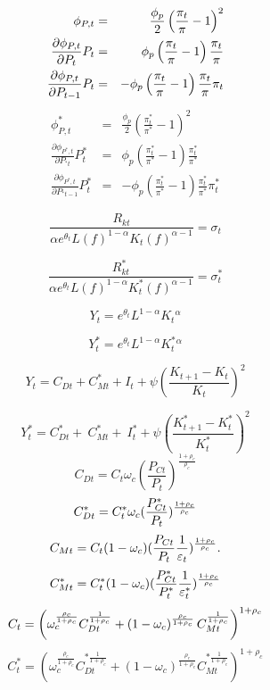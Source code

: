 \documentclass{article}
\begin{document}
\begin{eqnarray*}
\phi _{P,t} &=&\frac{\phi _{p}}{2}\left( \frac{\pi _{t}}{\pi }-1\right) ^{2}
\\
\frac{\partial \phi _{P,t}}{\partial P_{t}}P_{t} &=&\phi _{p}\left( \frac{%
\pi _{t}}{\pi }-1\right) \frac{\pi _{t}}{\pi } \\
\frac{\partial \phi _{P,t}}{\partial P_{t-1}}P_{t} &=&-\phi _{p}\left( \frac{%
\pi _{t}}{\pi }-1\right) \frac{\pi _{t}}{\pi }\pi _{t}
\end{eqnarray*}%
\begin{eqnarray*}
\phi _{P,t}^{\ast } &=&\frac{\phi _{p}}{2}\left( \frac{\pi _{t}^{\ast }}{\pi
^{\ast }}-1\right) ^{2} \\
\frac{\partial \phi _{P^{\ast },t}}{\partial P_{^{\ast }t}}P_{t}^{\ast }
&=&\phi _{p}\left( \frac{\pi _{t}^{\ast }}{\pi ^{\ast }}-1\right) \frac{\pi
_{t}^{\ast }}{\pi ^{\ast }} \\
\frac{\partial \phi _{P^{\ast },t}}{\partial P_{^{\ast }t-1}}P_{t}^{\ast }
&=&-\phi _{p}\left( \frac{\pi _{t}^{\ast }}{\pi ^{\ast }}-1\right) \frac{\pi
_{t}^{\ast }}{\pi ^{\ast }}\pi _{t}^{\ast }
\end{eqnarray*}

\[
\frac{R_{kt}}{\alpha e^{\theta _{t}}L(f)^{1-\alpha }K_{t}(f)^{\alpha -1}}%
=\sigma _{t} 
\]

\[
\frac{R_{kt}^{\ast }}{\alpha e^{\theta _{t}}L(f)^{1-\alpha }K_{t}^{\ast
}(f)^{\alpha -1}}=\sigma _{t}^{\ast } 
\]

\[
Y_{t}=e^{\theta _{t}}L^{1-\alpha }K_{t}{}^{\alpha } 
\]

\[
Y_{t}^{\ast }=e^{\theta _{t}}L^{1-\alpha }K_{t}^{\ast }{}^{\alpha } 
\]

\[
Y_{t}=C_{Dt}+C_{Mt}^{\ast }+I_{t}+\psi \left( \frac{K_{t+1}-K_{t}}{K_{t}}%
\right) ^{2} 
\]

\[
Y_{t}^{\ast }=C_{Dt}^{\ast }+\ C_{Mt}^{\ast }+\ I_{t}^{\ast }+\psi \left( 
\frac{K_{t+1}^{\ast }-K_{t}^{\ast }}{K_{t}^{\ast }}\right) ^{2} 
\]%
\[
C_{Dt}=C_{t}\omega _{c}(\frac{P_{Ct}}{P_{t}})^{\frac{1+\rho _{c}}{\rho _{c}}%
} 
\]%
\[
C_{Dt}^{\ast }=C_{t}^{\ast }\omega _{c}(\frac{P_{Ct}^{\ast }}{P_{t}})^{\frac{%
1+\rho _{c}}{\rho _{c}}} 
\]%
\[
C_{Mt}=C_{t}(1-\omega _{c})(\frac{P_{Ct}}{P_{t}}\frac{1}{\varepsilon _{t}})^{%
\frac{1+\rho _{c}}{\rho _{c}}}. 
\]%
\[
C_{Mt}^{\ast }=C_{t}^{\ast }(1-\omega _{c})(\frac{P_{Ct}^{\ast }}{%
P_{t}^{\ast }}\frac{1}{\varepsilon _{t}^{\ast }})^{\frac{1+\rho _{c}}{\rho
_{c}}} 
\]%
\[
C_{t}=\left( \omega _{c}^{\frac{\rho _{c}}{1+\rho _{c}}}C_{Dt}^{\frac{1}{%
1+\rho _{c}}}+\left( 1-\omega _{c}\right) ^{\frac{\rho _{c}}{1+\rho _{c}}%
}C_{Mt}^{\frac{1}{1+\rho _{c}}}\right) ^{1+\rho _{c}} 
\]%
\[
C_{t}^{\ast }=\left( \omega _{c}^{\frac{\rho _{c}}{1+\rho _{c}}}C_{Dt}^{\ast 
\frac{1}{1+\rho _{c}}}+\left( 1-\omega _{c}\right) ^{\frac{\rho _{c}}{1+\rho
_{c}}}C_{Mt}^{\ast \frac{1}{1+\rho _{c}}}\right) ^{1+\rho _{c}} 
\]
\end{document}
